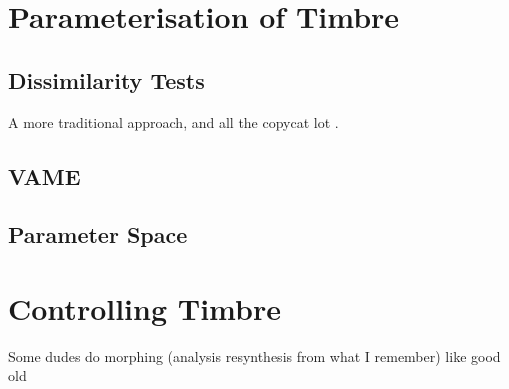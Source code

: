 \section{Parameterisation of Timbre}
\label{sec:Timbre-Parameterisation}

	\subsection{Dissimilarity Tests}
	\label{sec:Timbre-Dissimilarity}
		\note
		{
			A more traditional approach, \citet{grey1977multidimensional} and all the copycat lot 
			\citep{burgoyne2008a, caclin2005acoustic}.
		}

	\subsection{VAME}
	\label{sec:Timbre-VAME}

	\subsection{Parameter Space}
	\label{sec:Timbre-ParameterSpaces}

\section{Controlling Timbre}
\label{sec:Timbre-Control}
	
	\note
	{
		Some dudes do morphing (analysis resynthesis from what I remember) like good old 
		\citet{williams2007perceptually, williams2009perceptually, williams2010perceptually}
	}
